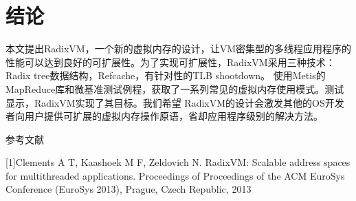 \section{结论}
本文提出RadixVM，一个新的虚拟内存的设计，让VM密集型的多线程应用程序的性能可以达到良好的可扩展性。为了实现可扩展性，RadixVM采用三种技术：Radix
tree数据结构，Refcache，有针对性的TLB
shootdown。
使用Metis的MapReduce库和微基准测试例程，获取了一系列常见的虚拟内存使用模式。测试显示，RadixVM实现了其目标。我们希望
RadixVM的设计会激发其他的OS开发者向用户提供可扩展的虚拟内存操作原语，省却应用程序级别的解决方法。

\begin{center}
参考文献
\end{center}
[1]\hspace{15pt}Clements A T, Kaashoek M F, Zeldovich N. RadixVM: Scalable address spaces for multithreaded applications. Proceedings of Proceedings of the ACM EuroSys Conference (EuroSys 2013), Prague, Czech Republic, 2013


\
